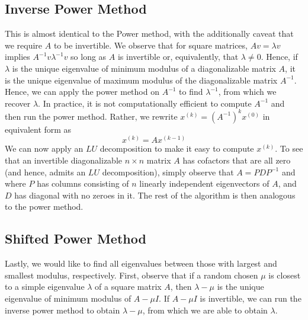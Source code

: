 \documentclass[12pt]{article}
\theoremstyle{plain}
\theoremstyle{definition}
\theoremstyle{remark}
\numberwithin{equation}{section}  %
\begin{document}
\subsection{Inverse Power Method}
This is almost identical to the Power method, with the additionally caveat that
we require $A$ to be invertible. We observe that for square matrices, $Av =
\lambda v$ implies $A^{-1}v \lambda^{-1}v$ so long as $A$ is invertible or,
equivalently, that $\lambda \neq 0$. Hence, if $\lambda$ is the unique
eigenvalue of minimum modulus of a diagonalizable matrix $A$, it is the
unique eigenvalue of maximum modulus of the diagonalizable matrix $A^{-1}$.
Hence, we can apply the power method on $A^{-1}$ to find $\lambda^{-1}$, from
which we recover $\lambda$. In practice, it is not computationally efficient to
compute $A^{-1}$ and then run the power method. Rather, we 
rewrite $x^{(k)} = (A^{-1})^k x^{(0)}$ in equivalent form as
\begin{equation*}
	x^{(k)} = Ax^{(k-1)}
\end{equation*}
We can now apply an $LU$ decomposition to make it easy to compute $x^{(k)}$.
To see that an invertible diagonalizable $n \times n$ matrix $A$ has cofactors that are all
zero (and hence, admits an $LU$ decomposition), simply observe that $A = PDP^{-1}$ and
where $P$ has columns consisting of $n$ linearly independent
eigenvectors of $A$, and $D$ has diagonal with no zeroes in it. 
The rest of the algorithm is then analogous to the power method.
\subsection{Shifted Power Method}	
Lastly, we would like to find all eigenvalues between those with largest and
smallest modulus, respectively. First, observe that if a random chosen $\mu$ is
closest to a simple eigenvalue $\lambda$ of a square matrix $A$, then $\lambda -
\mu$ is the unique eigenvalue of minimum modulus of $A - \mu I$. If $A - \mu I$
is invertible, we can run the inverse power method to obtain $\lambda - \mu$,
from which we are able to obtain $\lambda$.
\end{document}
